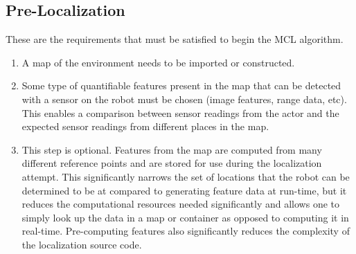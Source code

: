 \documentclass[a4paper,11pt]{article}
\begin{document}
\subsection{Pre-Localization}
 These are the requirements that must be satisfied to begin the MCL algorithm.
  \begin{enumerate}
  \item A map of the environment needs to be imported or constructed. 
  \item Some type of quantifiable features present in the map that can be detected with a sensor on the robot must be chosen (image features, range data, etc). This enables a comparison between sensor readings from the actor and the expected sensor readings from different places in the map.
  \item This step is optional.  Features from the map are computed from many different reference points and are stored for use during the localization attempt. This significantly narrows the set of locations that the robot can be determined to be at compared to generating feature data at run-time, but it reduces the computational resources needed significantly and allows one to simply look up the data in a map or container as opposed to computing it in real-time. Pre-computing features also significantly reduces the complexity of the localization source code.
  \end{enumerate}
\end{document}
